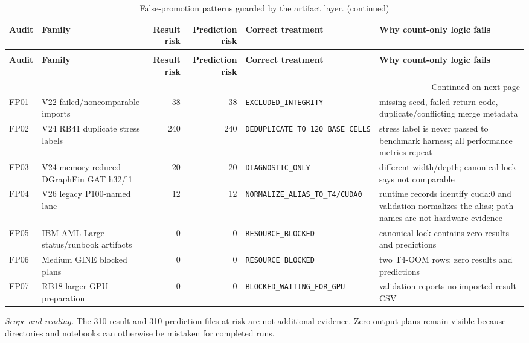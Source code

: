 \begingroup
\footnotesize
\setlength{\tabcolsep}{3pt}
\renewcommand{\arraystretch}{1.10}
\begin{longtable}{@{}p{} p{} r r p{} p{}@{}}
\caption{False-promotion patterns guarded by the artifact layer.}\label{tab:s-false-promotions-v2}\\
\toprule
\textbf{Audit} & \textbf{Family} & \textbf{Result risk} & \textbf{Prediction risk} & \textbf{Correct treatment} & \textbf{Why count-only logic fails} \\
\midrule
\endfirsthead
\caption[]{False-promotion patterns guarded by the artifact layer. (continued)}\\
\toprule
\textbf{Audit} & \textbf{Family} & \textbf{Result risk} & \textbf{Prediction risk} & \textbf{Correct treatment} & \textbf{Why count-only logic fails} \\
\midrule
\endhead
\midrule
\multicolumn{6}{r}{\footnotesize Continued on next page}\\
\endfoot
\bottomrule
\endlastfoot
FP01 & V22 failed/noncomparable imports & 38 & 38 & \texttt{EXCLUDED\_\allowbreak{}INTEGRITY} & missing seed, failed return-code, duplicate/conflicting merge metadata \\
FP02 & V24 RB41 duplicate stress labels & 240 & 240 & \texttt{DEDUPLICATE\_\allowbreak{}TO\_\allowbreak{}120\_\allowbreak{}BASE\_\allowbreak{}CELLS} & stress label is never passed to benchmark harness; all performance metrics repeat \\
FP03 & V24 memory-reduced DGraphFin GAT h32/l1 & 20 & 20 & \texttt{DIAGNOSTIC\_\allowbreak{}ONLY} & different width/depth; canonical lock says not comparable \\
FP04 & V26 legacy P100-named lane & 12 & 12 & \texttt{NORMALIZE\_\allowbreak{}ALIAS\_\allowbreak{}TO\_\allowbreak{}T4/\allowbreak{}CUDA0} & runtime records identify cuda:0 and validation normalizes the alias; path names are not hardware evidence \\
FP05 & IBM AML Large status/runbook artifacts & 0 & 0 & \texttt{RESOURCE\_\allowbreak{}BLOCKED} & canonical lock contains zero results and predictions \\
FP06 & Medium GINE blocked plans & 0 & 0 & \texttt{RESOURCE\_\allowbreak{}BLOCKED} & two T4-OOM rows; zero results and predictions \\
FP07 & RB18 larger-GPU preparation & 0 & 0 & \texttt{BLOCKED\_\allowbreak{}WAITING\_\allowbreak{}FOR\_\allowbreak{}GPU} & validation reports no imported result CSV \\
\end{longtable}
\noindent\footnotesize\emph{Scope and reading.} The 310 result and 310 prediction files at risk are not additional evidence. Zero-output plans remain visible because directories and notebooks can otherwise be mistaken for completed runs.\par
\endgroup
